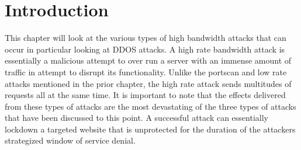 
\section*{Introduction}
This chapter will look at the various types of high bandwidth attacks that can occur in particular looking at DDOS attacks. A high rate bandwidth attack is essentially a malicious attempt to over run a server with an immense amount of traffic in attempt to disrupt its functionality. Unlike the portscan and low rate attacks mentioned in the prior chapter, the high rate attack sends multitudes of requests all at the same time. It is important to note that the effects delivered from these types of attacks are the most devastating of the three types of attacks that have been discussed to this point. A successful attack can essentially lockdown a targeted website that is unprotected for the duration of the attackers strategized window of service denial. 
